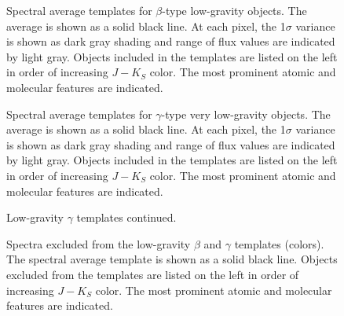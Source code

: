 \documentclass[modern]{aastex61}
\begin{document}
\clearpage



\clearpage
\begin{figure}
  \caption{Spectral average templates for $\beta$-type low-gravity objects. The average is shown as a solid black line. At each pixel, the 1$\sigma$ variance is shown as dark gray shading and range of flux values are indicated by light gray. Objects included in the templates are listed on the left in order of increasing $J-K_S$ color. The most prominent atomic and molecular features are indicated. }
  \label{fig:beta_templates}
\end{figure}

\begin{figure}
  \caption{Spectral average templates for $\gamma$-type very low-gravity objects. The average is shown as a solid black line. At each pixel, the 1$\sigma$ variance is shown as dark gray shading and range of flux values are indicated by light gray. Objects included in the templates are listed on the left in order of increasing $J-K_S$ color. The most prominent atomic and molecular features are indicated. }
  \label{fig:gamma_templates}
\end{figure}

\begin{figure}
  \caption{Low-gravity $\gamma$ templates continued.}
\end{figure}

\begin{figure}
  \caption{Spectra excluded from the low-gravity $\beta$ and $\gamma$ templates (colors). The spectral average template is shown as a solid black line. Objects excluded from the templates are listed on the left in order of increasing $J-K_S$ color. The most prominent atomic and molecular features are indicated.}
  \label{fig:lowg_excluded}
\end{figure}

\clearpage

\end{document}
